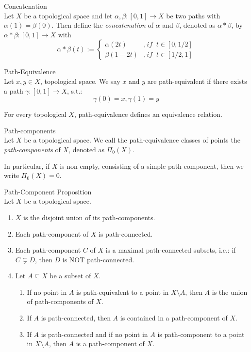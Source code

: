 \begin{definition}{Concatenation}\\
Let $X$ be a topological space and let $\alpha, \beta: [0,1] \to X$ be two paths with $\alpha(1) = \beta (0)$. Then define the \textit{concatenation} of $\alpha$ and $\beta$, denoted as $\alpha * \beta$, by $\alpha * \beta: [0,1] \to X$ with
$$\alpha * \beta (t) := \begin{cases}
    \alpha (2t) &,if\; \; t\in [0,1/2]\\
    \beta (1-2t) &,if\;\; t\in [1/2,1]
\end{cases}$$
\end{definition}

\begin{definition}{Path-Equivalence}\\
Let $x,y \in X$, topological space. We say $x$ and $y$ are path-equivalent if there exists a path $\gamma : [0,1] \to X$, s.t.:
$$\gamma (0) = x, \gamma (1) = y$$
\end{definition}

\begin{proposition}
    For every topological $X$, path-equivalence defines an equivalence relation.
\end{proposition}

\begin{definition}{Path-components}\\
Let $X$ be a topological space. We call the path-equivalence classes of points the \textit{path-components} of $X$, denoted as $\Pi_0 (X)$.

In particular, if $X$ is non-empty, consisting of a simple path-component, then we write $\Pi_0(X) =0$.
\end{definition}

\begin{proposition}{Path-Component Proposition}\\
Let $X$ be a topological space.
\begin{enumerate}
    \item $X$ is the disjoint union of its path-components.
    \item Each path-component of $X$ is path-connected.
    \item Each path-component $C$ of $X$ is a maximal path-connected subsets, i.e.: if $C \subsetneq D$, then $D$ is NOT path-connected.
    \item Let $A \subseteq X$ be a subset of $X$.
    \begin{enumerate}
        \item If no point in $A$ is path-equivalent to a point in $X \setminus A$, then $A$ is the union of path-components of $X$.
        \item If $A$ is path-connected, then $A$ is contained in a path-component of $X$.
        \item If $A$ is path-connected and if no point in $A$ is path-component to a point in $X \setminus A$, then $A$ is a path-component of $X$.
    \end{enumerate}
\end{enumerate}
\end{proposition}

